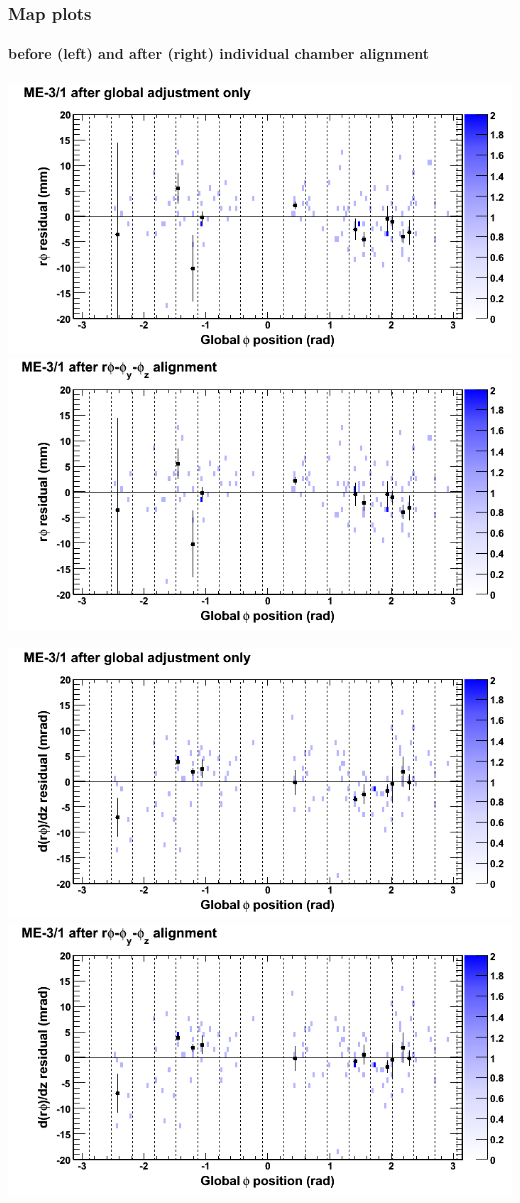 \documentclass[compress]{beamer}
\begin{document}
\begin{frame}
\frametitle{Map plots}
\framesubtitle{before (left) and after (right) individual chamber alignment}
\includegraphics[width=0.5\linewidth]{ringmapplots_3dof/before_CSCvsphi_mem31_x.png} \includegraphics[width=0.5\linewidth]{ringmapplots_3dof/after_CSCvsphi_mem31_x.png}

\includegraphics[width=0.5\linewidth]{ringmapplots_3dof/before_CSCvsphi_mem31_dxdz.png} \includegraphics[width=0.5\linewidth]{ringmapplots_3dof/after_CSCvsphi_mem31_dxdz.png}
\end{frame}
\end{document}
